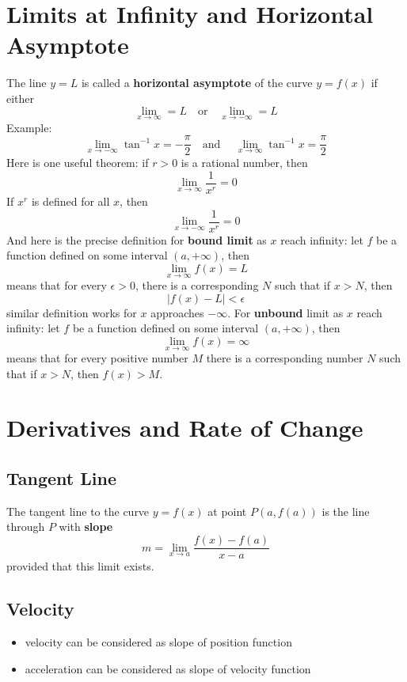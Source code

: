 \documentclass[10pt,a4paper,oneside]{article}
\begin{document}
\section{Limits at Infinity and Horizontal Asymptote}
The line $y = L$ is called a \textbf{horizontal asymptote} of the curve $y = f(x)$ if either
\[
\lim_{x \rightarrow \infty} = L \quad \text{or} \quad  \lim_{x \rightarrow -\infty} = L
\]
Example:
\[
\lim_{x \rightarrow -\infty} \tan^{-1}x = -\frac{\pi}{2} \quad \text{and } \quad \lim_{x \rightarrow \infty} \tan^{-1} x = \frac{\pi}{2}
\]
Here is one useful theorem: if $r>0$ is a rational number, then
\[
\lim_{x \rightarrow \infty} \frac{1}{x^r} = 0
\]
If $x^r$ is defined for all $x$, then
\[
\lim_{x \rightarrow -\infty} \frac{1}{x^r} = 0
\]
And here is the precise definition for \textbf{bound limit} as $x$ reach infinity: let $f$ be a function defined on some interval $(a, +\infty)$, then
\[
\lim_{x \rightarrow \infty} f(x) = L
\]
means that for every $\epsilon>0$, there is a corresponding $N$ such that if $x>N$, then
\[
| f(x) - L | < \epsilon
\]
similar definition works for $x$ approaches $-\infty$.  For \textbf{unbound} limit as $x$ reach infinity: let $f$ be a function defined on some interval $(a, +\infty)$, then
\[
\lim_{x \rightarrow \infty} f(x) = \infty
\]
means that for every positive number $M$ there is a corresponding number $N$ such that if $x>N$, then $f(x)>M$.

\section{Derivatives and Rate of Change}
\subsection{Tangent Line}
The tangent line to the curve $y = f(x)$ at point $P(a, f(a))$ is the line through $P$ with \textbf{slope}
\[
m = \lim_{x \rightarrow a} \frac{f(x) - f(a)}{x-a}
\]
provided that this limit exists.

\subsection{Velocity}
\begin{itemize}
	\item velocity can be considered as slope of position function
	\item acceleration can be considered as slope of velocity function
\end{itemize}
\end{document}
